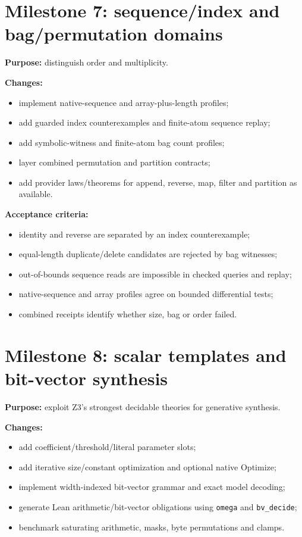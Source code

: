 \documentclass[11pt,oneside]{report}
\newcommand{\code}[1]{\texttt{#1}}
\begin{document}
\section{Milestone 7: sequence/index and bag/permutation domains}

\textbf{Purpose:} distinguish order and multiplicity.

\textbf{Changes:}

\begin{itemize}[leftmargin=2em]
\item implement native-sequence and array-plus-length profiles;
\item add guarded index counterexamples and finite-atom sequence replay;
\item add symbolic-witness and finite-atom bag count profiles;
\item layer combined permutation and partition contracts;
\item add provider laws/theorems for append, reverse, map, filter and partition as available.
\end{itemize}

\textbf{Acceptance criteria:}

\begin{itemize}[leftmargin=2em]
\item identity and reverse are separated by an index counterexample;
\item equal-length duplicate/delete candidates are rejected by bag witnesses;
\item out-of-bounds sequence reads are impossible in checked queries and replay;
\item native-sequence and array profiles agree on bounded differential tests;
\item combined receipts identify whether size, bag or order failed.
\end{itemize}

\section{Milestone 8: scalar templates and bit-vector synthesis}

\textbf{Purpose:} exploit Z3's strongest decidable theories for generative synthesis.

\textbf{Changes:}

\begin{itemize}[leftmargin=2em]
\item add coefficient/threshold/literal parameter slots;
\item add iterative size/constant optimization and optional native Optimize;
\item implement width-indexed bit-vector grammar and exact model decoding;
\item generate Lean arithmetic/bit-vector obligations using \code{omega} and \code{bv\_decide};
\item benchmark saturating arithmetic, masks, byte permutations and clamps.
\end{itemize}
\end{document}
